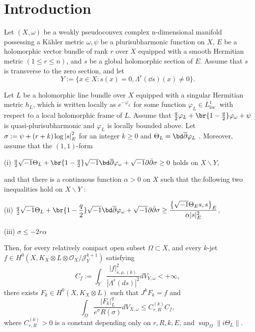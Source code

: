 \documentclass[lang=cn,12pt,fontset=none,a4paper]{beautybook}
\begin{document}
\section{Introduction}
\begin{theorem}
   Let $(X, \omega)$ be a weakly pseudoconvex complex n-dimensional manifold possessing a Kähler metric $\omega, \psi$ be a plurisubharmonic function on $X$, $E$ be a holomorphic vector bundle of rank $r$ over $X$ equipped with a smooth Hermitian metric $(1 \leq r\leq n)$, and $s$ be a global holomorphic section of $E$. Assume that $s$ is transverse to the zero section, and let
$$
Y:=\{x \in X: s(x)=0, \Lambda^r (\dd s)(x)\neq 0\} .
$$

Let $L$ be a holomorphic line bundle over $X$ equipped with a singular Hermitian metric $h_L$, which is written locally as $e^{-\varphi_L}$ for some function $\varphi_L \in L_{\text {loc }}^1$ with respect to a local holomorphic frame of $L$. Assume that $\frac{q}{2}\varphi_L+\br{1-\frac{q}{2}}\varphi_\omega+\psi$ is quasi-plurisubharmonic and $\varphi_L$ is locally bounded above. Let $\sigma:=\psi+(r+k)\log \abs{s}^2_E$  for an integer $k\geqslant 0$  and $\Theta_L=\bd\bdd\varphi_L$ .  Moreover, assume that the $(1,1)$-form  

(i) $\frac{q}{2}\sqrt{-1} \Theta_L+\br{1-\frac{q}{2}}\sqrt{-1}\bd\bdd\varphi_\omega+ \sqrt{-1} \partial \bar{\partial} \sigma \geq 0$ holds on $X \backslash Y$, 

and that there is a continuous function $\alpha>0$ on $X$ such that the following two inequalities hold on $X \backslash Y$ :

(ii) $\frac{q}{2}\displaystyle\sqrt{-1} \Theta_L+\br{1-\frac{q}{2}}\sqrt{-1}\bd\bdd\varphi_\omega+\sqrt{-1} \partial \bar{\partial} \sigma \geq \frac{\left\{\sqrt{-1} \Theta_E s, s\right\}_E}{\alpha|s|_E^2}$,

(iii) $\sigma\leq-2 r \alpha$

Then, for every relatively compact open subset $\Omega \subset X$, and every $k$-jet $f \in H^0\left(X, K_X\otimes L \otimes \mathcal{O}_X / \mathcal{J}_Y^{k+1}\right)$ satisfying
$$
C_f :=\int_Y \frac{|f|_{s, \rho,(k)}^2}{\left|\Lambda^r(d s)\right|^{2} }d V_{Y, \omega}<+\infty,
$$
there exists $F_k \in H^0\left(X, K_X \otimes L\right)$ such that $J^k F_k=f$ and
$$
\int_{\Omega} \frac{\left|F_k\right|_L^q}{e^\sigma R(\sigma)} d V_{X, \omega} \leq C_{r,R}^{(k)} C_f,
$$
where $C_{r,R}^{(k)}>0$ is a constant depending only on $r, R,k, E$, and $\sup _{\Omega}\|i \Theta_L\|$.

\end{theorem}
\end{document}
